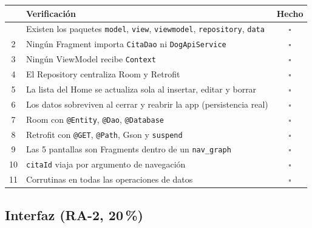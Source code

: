 \documentclass[11pt,letterpaper]{article}
\newcommand{\code}[1]{\texttt{\small #1}}
\begin{document}
\begin{center}
\small
\begin{xltabular}{\linewidth}{@{}c X c@{}}
\toprule
& \textbf{Verificaci\'on} & \textbf{Hecho}\\
\midrule
\endhead
\bottomrule
{} & Existen los paquetes \code{model}, \code{view}, \code{viewmodel}, \code{repository}, \code{data} & $\square$\\
2 & Ning\'un Fragment importa \code{CitaDao} ni \code{DogApiService} & $\square$\\
3 & Ning\'un ViewModel recibe \code{Context} & $\square$\\
4 & El Repository centraliza Room y Retrofit & $\square$\\
5 & La lista del Home se actualiza sola al insertar, editar y borrar & $\square$\\
6 & Los datos sobreviven al cerrar y reabrir la app (persistencia real) & $\square$\\
7 & Room con \code{@Entity}, \code{@Dao}, \code{@Database} & $\square$\\
8 & Retrofit con \code{@GET}, \code{@Path}, Gson y \code{suspend} & $\square$\\
9 & Las 5 pantallas son Fragments dentro de un \code{nav\_graph} & $\square$\\
10 & \code{citaId} viaja por argumento de navegaci\'on & $\square$\\
11 & Corrutinas en todas las operaciones de datos & $\square$\\
\end{xltabular}
\end{center}

\subsection{Interfaz (RA-2, 20\,\%)}
\end{document}
